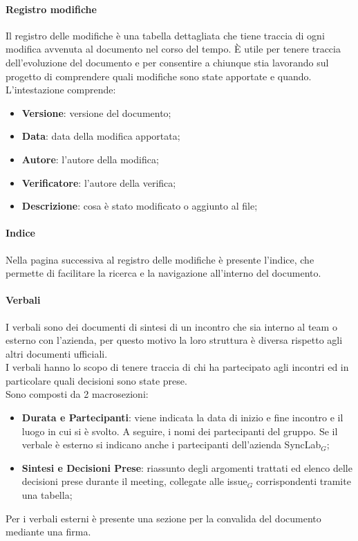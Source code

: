     \paragraph{Registro modifiche}
    Il registro delle modifiche è una tabella dettagliata che tiene traccia di ogni modifica avvenuta al documento nel corso del tempo. È utile per tenere traccia dell’evoluzione del documento e per consentire a chiunque stia lavorando sul progetto di comprendere quali modifiche sono state apportate e quando.
    L’intestazione comprende:
    \begin{itemize}
    \item \textbf{Versione}: versione del documento;
    \item \textbf{Data}: data della modifica apportata;
    \item \textbf{Autore}: l’autore della modifica;
    \item \textbf{Verificatore}: l’autore della verifica;
    \item \textbf{Descrizione}: cosa è stato modificato o aggiunto al file;
    \end{itemize}

    \paragraph{Indice}
    Nella pagina successiva al registro delle modifiche è presente l’indice, che permette di facilitare la ricerca e la navigazione all’interno del documento. \\

    \paragraph{Verbali}
    I verbali sono dei documenti di sintesi di un incontro che sia interno al team o esterno con l'azienda, per questo motivo la loro struttura è diversa rispetto agli altri documenti ufficiali.\\
    I verbali hanno lo scopo di tenere traccia di chi ha partecipato agli incontri ed in particolare quali decisioni sono state prese.\\
    Sono composti da 2 macrosezioni:
    \begin{itemize}
    \item  \textbf{Durata e Partecipanti}: viene indicata la data di inizio e fine incontro e il luogo in cui si è svolto. A seguire, i nomi dei partecipanti del gruppo. Se il verbale è esterno si indicano anche i partecipanti dell'azienda SyncLab$_G$;
    \item  \textbf{Sintesi e Decisioni Prese}: riassunto degli argomenti trattati ed elenco delle decisioni prese durante il meeting, collegate alle issue$_G$ corrispondenti tramite una tabella;
    \end{itemize}
    Per i verbali esterni è presente una sezione per la convalida del documento mediante una firma.\\

